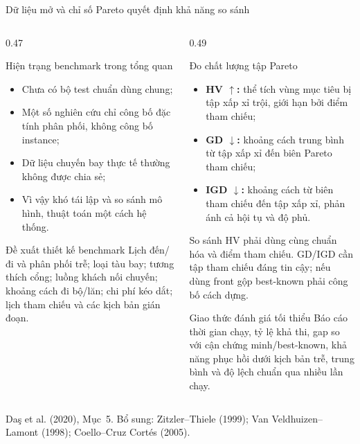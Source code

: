 \documentclass[aspectratio=169,10pt]{beamer}
\begin{document}
\begin{frame}[t]{Dữ liệu mở và chỉ số Pareto quyết định khả năng so sánh}

\footnotesize
\begin{columns}[T,onlytextwidth]
\begin{column}{0.47\textwidth}
\begin{alertblock}{Hiện trạng benchmark trong tổng quan}
\begin{itemize}
    \setlength{\itemsep}{1pt}
    \item Chưa có bộ test chuẩn dùng chung;
    \item Một số nghiên cứu chỉ công bố đặc tính phân phối, không công bố instance;
    \item Dữ liệu chuyến bay thực tế thường không được chia sẻ;
    \item Vì vậy khó tái lập và so sánh mô hình, thuật toán một cách hệ thống.
\end{itemize}
\end{alertblock}

\begin{block}{Đề xuất thiết kế benchmark}
Lịch đến/đi và phân phối trễ; loại tàu bay; tương thích cổng;
luồng khách nối chuyến; khoảng cách đi bộ/lăn; chi phí kéo dắt;
lịch tham chiếu và các kịch bản gián đoạn.
\end{block}
\end{column}

\begin{column}{0.49\textwidth}
\begin{block}{Đo chất lượng tập Pareto}
\begin{itemize}
    \setlength{\itemsep}{1pt}
    \item \textbf{HV $\uparrow$:} thể tích vùng mục tiêu bị tập xấp xỉ trội, giới hạn bởi điểm tham chiếu;
    \item \textbf{GD $\downarrow$:} khoảng cách trung bình từ tập xấp xỉ đến biên Pareto tham chiếu;
    \item \textbf{IGD $\downarrow$:} khoảng cách từ biên tham chiếu đến tập xấp xỉ, phản ánh cả hội tụ và độ phủ.
\end{itemize}
{\scriptsize So sánh HV phải dùng cùng chuẩn hóa và điểm tham chiếu. GD/IGD cần tập tham chiếu đáng tin cậy; nếu dùng front gộp best-known phải công bố cách dựng.}
\end{block}

\begin{exampleblock}{Giao thức đánh giá tối thiểu}
Báo cáo thời gian chạy, tỷ lệ khả thi, gap so với cận chứng minh/best-known,
khả năng phục hồi dưới kịch bản trễ, trung bình và độ lệch chuẩn qua nhiều lần chạy.
\end{exampleblock}
\end{column}
\end{columns}

\vfill
\tiny Da\c{s} et al. (2020), Mục~5. Bổ sung: Zitzler--Thiele (1999);
Van Veldhuizen--Lamont (1998); Coello--Cruz Cort\'es (2005).
\end{frame}
\end{document}
